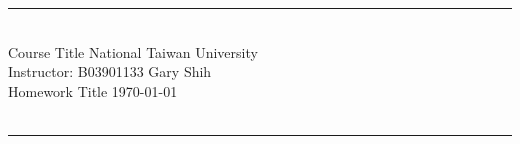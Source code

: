\documentclass[12pt, a4paper]{article}
\begin{document}
{\bf \noindent
\rule[3pt]{\textwidth}{0.3pt}\\
Course Title \hfill National Taiwan University \\
Instructor: \hfill B03901133 Gary Shih \\
Homework Title \hfill \today\\
\vspace{-10pt} \\
\rule[3pt]{\textwidth}{1.3pt}\\
[-1cm]
}
\end{document}
